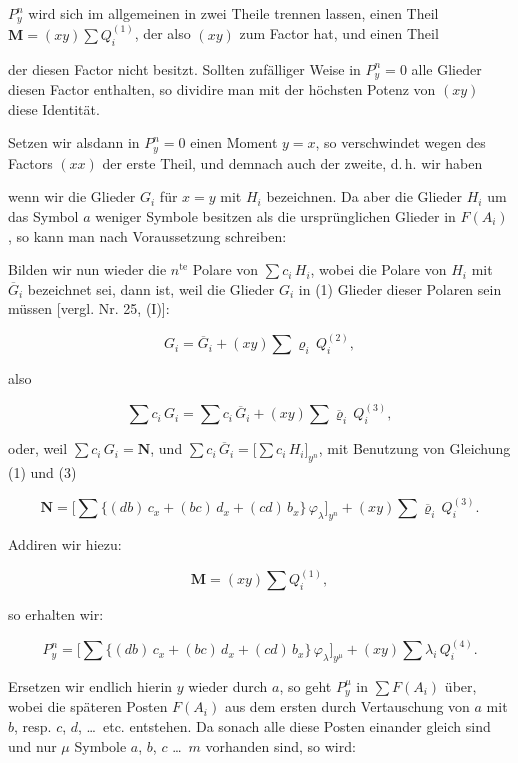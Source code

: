 $P_y^n$ wird sich im allgemeinen in zwei Theile trennen lassen, einen
Theil $\mathbf{M} = (xy) \sum Q_i^{(1)}$, der also $(xy)$ zum Factor hat, und einen
Theil


der diesen Factor nicht besitzt. Sollten zufälliger Weise in $P_y^n = 0$
alle Glieder diesen Factor enthalten, so dividire man mit der höchsten
Potenz von $(xy)$ diese Identität.

Setzen wir alsdann in $P_y^n = 0$ einen Moment $y = x$, so verschwindet
wegen des Factors $(xx)$ der erste Theil, und demnach auch der zweite,
d.\,h. wir haben


wenn wir die Glieder $G_i$ für $x = y$ mit $H_i$ bezeichnen. Da aber die
Glieder $H_i$ um das Symbol $a$ weniger Symbole besitzen als die ursprünglichen
Glieder in $F(A_i)$, so kann man nach Voraussetzung schreiben:


Bilden wir nun wieder die $n^{\text{te}}$ Polare von $\sum c_i\,H_i$, wobei die
Polare von $H_i$ mit $\overline{G}_i$ bezeichnet sei, dann ist, weil die Glieder $G_i$
in (1) Glieder dieser Polaren sein müssen [vergl. Nr. 25, (I)]:

\[
G_i = \overline{G}_i + (xy) \sum \varrho_i\,Q_i^{(2)},
\]

also

\[
\sum c_i\,G_i = \sum c_i\,\overline{G}_i + (xy) \sum \overline{\varrho}_i\,Q_i^{(3)},
\]

oder, weil $\sum c_i\,G_i = \mathbf{N}$, und $\sum c_i\,\overline{G}_i = \big[\sum c_i\,H_i\big]_{y^n}$,
mit Benutzung von Gleichung (1) und (3)

\[
\mathbf{N} = \Big[\sum \{(db)\,c_x + (bc)\,d_x + (cd)\,b_x\}\,\varphi_\lambda\Big]_{y^n} + (xy) \sum \overline{\varrho}_i\,Q_i^{(3)}.
\]


Addiren wir hiezu:

\[
\mathbf{M} = (xy) \sum Q_i^{(1)},
\]

so erhalten wir:

\[
P_y^n = \Big[\sum \{(db)\,c_x + (bc)\,d_x + (cd)\,b_x\}\,\varphi_\lambda\Big]_{y^\mu} + (xy) \sum \lambda_i\,Q_i^{(4)}.
\]

Ersetzen wir endlich hierin $y$ wieder durch $a$, so geht $P_y^\mu$ in
$\sum F(A_i)$ über, wobei die späteren Posten $F(A_i)$ aus dem ersten durch
Vertauschung von $a$ mit $b$, resp. $c$, $d$, \dots\ etc. entstehen. Da sonach
alle diese Posten einander gleich sind und nur $\mu$ Symbole $a$, $b$, $c$ \dots\
$m$ vorhanden sind, so wird:

